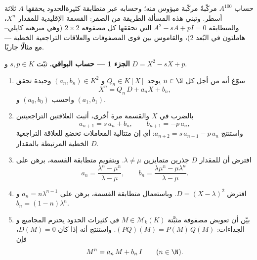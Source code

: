 \begin{problem}\label{pb:b1:matrices:1}
حساب $A^{100}$ مركّبةً مركّبة ميؤوس منه؛ وحسابه
عبر متطابقة كثيرةالحدود يحققها $A$ ثلاثة أسطر.
وتبني هذه المسألة الطريقة من الصفر: القسمة الإقليدية
للمقدار $X^n$، والمتطابقة $A^2 - sA + pI = 0$ التي تحققها كل مصفوفة $2
\times 2$ (وهي مبرهنة كايلي--هاملتون في البُعد
$2$)، والقاموس بين قوى المصفوفات والعلاقات
التراجعية الخطية --- مع  مثالًا جاريًا.

\medskip
\noindent\textbf{الجزء 1 --- حساب البواقي.} ثبّت $s, p
\in K$ و $D = X^2 - sX + p$.
\begin{enumerate}
  \item سوّغ أنه من أجل كل $n \in \N$ يوجد $Q_n
        \in K[X]$ و $(a_n, b_n) \in K^2$ وحيدة تحقق
        \[
        X^n = Q_n\,D + a_n X + b_n ,
        \]
        واحسب $(a_0, b_0)$ و $(a_1, b_1)$.
  \item بالضرب في $X$ والقسمة مرة أخرى، أثبت
        العلاقتين التراجعيتين
        \[
        a_{n+1} = s\,a_n + b_n,
        \qquad
        b_{n+1} = -p\,a_n ,
        \]
        واستنتج $a_{n+2} = s\,a_{n+1} - p\,a_n$: أي إن
        متتالية المعاملات تخضع للعلاقة التراجعية الخطية المرتبطة
        بالمقدار $D$.
  \item افترض أن للمقدار $D$ جذرين متمايزين $\lambda \neq \mu$.
        وبتقويم متطابقة القسمة، برهن على
        \[
        a_n = \frac{\lambda^n - \mu^n}{\lambda - \mu},
        \qquad
        b_n = \frac{\lambda\mu^n - \mu\lambda^n}{\lambda - \mu} .
        \]
  \item افترض $D = (X - \lambda)^2$. وباستعمال 
        متطابقة القسمة، برهن على $a_n = n\lambda^{n-1}$ و
        $b_n = (1 - n)\lambda^{n}$.
  \item بيّن أن تعويض مصفوفة مثبَّتة $M \in
        \mathcal{M}_k(K)$ في كثيرات الحدود يحترم المجاميع و
        الجداءات: $(PQ)(M) = P(M)\,Q(M)$. واستنتج أنه إذا كان $D(M) =
        0$، فإن
        \[
        M^n = a_n\,M + b_n\,I \qquad (n \in \N).
        \]
\end{enumerate}


\end{problem}
